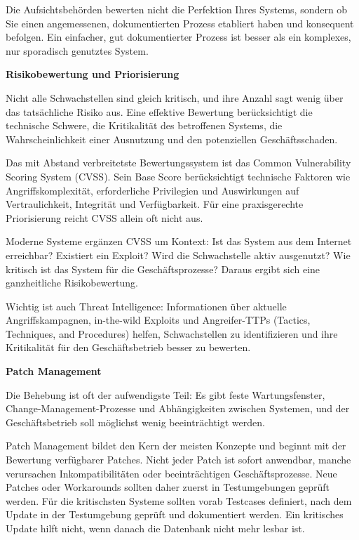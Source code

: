 Die Aufsichtsbehörden bewerten nicht die Perfektion Ihres Systems, sondern ob Sie einen angemessenen, dokumentierten Prozess etabliert haben und konsequent befolgen. Ein einfacher, gut dokumentierter Prozess ist besser als ein komplexes, nur sporadisch genutztes System.

\textbf{Risikobewertung und Priorisierung}

Nicht alle Schwachstellen sind gleich kritisch, und ihre Anzahl sagt wenig über das tatsächliche Risiko aus. Eine effektive Bewertung berücksichtigt die technische Schwere, die Kritikalität des betroffenen Systems, die Wahrscheinlichkeit einer Ausnutzung und den potenziellen Geschäftsschaden.

Das mit Abstand verbreitetste Bewertungssystem ist das Common Vulnerability Scoring System (CVSS). Sein Base Score berücksichtigt technische Faktoren wie Angriffskomplexität, erforderliche Privilegien und Auswirkungen auf Vertraulichkeit, Integrität und Verfügbarkeit. Für eine praxisgerechte Priorisierung reicht CVSS allein oft nicht aus.

Moderne Systeme ergänzen CVSS um Kontext: Ist das System aus dem Internet erreichbar? Existiert ein Exploit? Wird die Schwachstelle aktiv ausgenutzt? Wie kritisch ist das System für die Geschäftsprozesse? Daraus ergibt sich eine ganzheitliche Risikobewertung.

Wichtig ist auch Threat Intelligence: Informationen über aktuelle Angriffskampagnen, in-the-wild Exploits und Angreifer-TTPs (Tactics, Techniques, and Procedures) helfen, Schwachstellen zu identifizieren und ihre Kritikalität für den Geschäftsbetrieb besser zu bewerten.

\textbf{Patch Management}

Die Behebung ist oft der aufwendigste Teil: Es gibt feste Wartungsfenster, Change-Management-Prozesse und Abhängigkeiten zwischen Systemen, und der Geschäftsbetrieb soll möglichst wenig beeinträchtigt werden.

Patch Management bildet den Kern der meisten Konzepte und beginnt mit der Bewertung verfügbarer Patches. Nicht jeder Patch ist sofort anwendbar, manche verursachen Inkompatibilitäten oder beeinträchtigen Geschäftsprozesse. Neue Patches oder Workarounds sollten daher zuerst in Testumgebungen geprüft werden. Für die kritischsten Systeme sollten vorab Testcases definiert, nach dem Update in der Testumgebung geprüft und dokumentiert werden. Ein kritisches Update hilft nicht, wenn danach die Datenbank nicht mehr lesbar ist.

